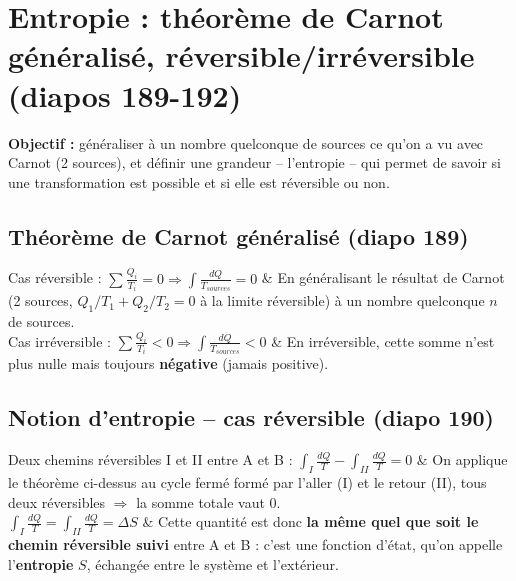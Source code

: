 \section{Entropie : théorème de Carnot généralisé, réversible/irréversible (diapos 189-192)}

\begin{objectif}
\textbf{Objectif :} généraliser à un nombre quelconque de sources ce qu'on a vu avec Carnot (2 sources), et
définir une grandeur -- l'entropie -- qui permet de savoir si une transformation est possible et si elle est
réversible ou non.
\end{objectif}

\subsection*{Théorème de Carnot généralisé (diapo 189)}
\begin{demotable}
Cas réversible : $\displaystyle\sum\frac{Q_i}{T_i}=0 \Rightarrow \int\frac{dQ}{T_{sources}}=0$ &
En généralisant le résultat de Carnot (2 sources, $Q_1/T_1+Q_2/T_2=0$ à la limite réversible) à un nombre
quelconque $n$ de sources. \\
Cas irréversible : $\displaystyle\sum\frac{Q_i}{T_i}<0 \Rightarrow \int\frac{dQ}{T_{sources}}<0$ &
En irréversible, cette somme n'est plus nulle mais toujours \textbf{négative} (jamais positive). \\
\end{demotable}

\subsection*{Notion d'entropie -- cas réversible (diapo 190)}
\begin{demotable}
Deux chemins réversibles I et II entre A et B : $\displaystyle\int_I\frac{dQ}{T}-\int_{II}\frac{dQ}{T}=0$ &
On applique le théorème ci-dessus au cycle fermé formé par l'aller (I) et le retour (II), tous deux
réversibles $\Rightarrow$ la somme totale vaut $0$. \\
$\displaystyle\int_I\frac{dQ}{T}=\int_{II}\frac{dQ}{T}=\boxed{\Delta S}$ &
Cette quantité est donc \textbf{la même quel que soit le chemin réversible suivi} entre A et B : c'est une
fonction d'état, qu'on appelle l'\textbf{entropie} $S$, échangée entre le système et l'extérieur. \\
\end{demotable}

